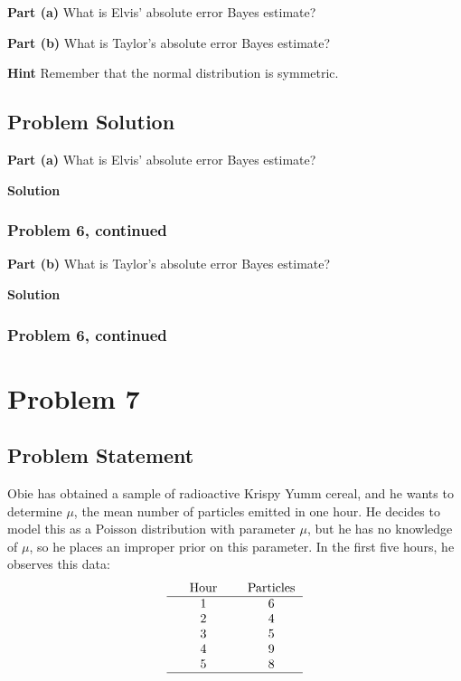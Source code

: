 \documentclass[12pt]{article}
\theoremstyle{definition}
\begin{document}
\bigskip
\noindent
{\bf Part (a)} What is Elvis' absolute error Bayes estimate?

\bigskip
\noindent
{\bf Part (b)} What is Taylor's absolute error Bayes estimate?

\bigskip
\noindent
{\bf Hint} Remember that the normal distribution is symmetric.

\subsection*{Problem Solution}

\bigskip
\noindent
{\bf Part (a)} What is Elvis' absolute error Bayes estimate?

\bigskip
\noindent
{\bf Solution}


\newpage
\subsubsection*{Problem 6, continued}

\vspace{3.5in}
\noindent
{\bf Part (b)} What is Taylor's absolute error Bayes estimate?

\bigskip
\noindent
{\bf Solution}

\newpage
\subsubsection*{Problem 6, continued}




\newpage
\section*{Problem 7}

\subsection*{Problem Statement}

Obie has obtained a sample of radioactive Krispy Yumm cereal, and he wants to determine $\mu$, the mean number of particles emitted in one hour. He decides to model this as a Poisson distribution with parameter $\mu$, but he has no knowledge of $\mu$, so he places an improper prior on this parameter. In the first five hours, he observes this data:
$$
\begin{tabular}{ccccc}
& Hour & & Particles\\
\hline
& 1 & & 6\\
& 2 & & 4\\
& 3 & & 5\\
& 4 & & 9\\
& 5 & & 8\\
\hline
\end{tabular}
$$
\end{document}
